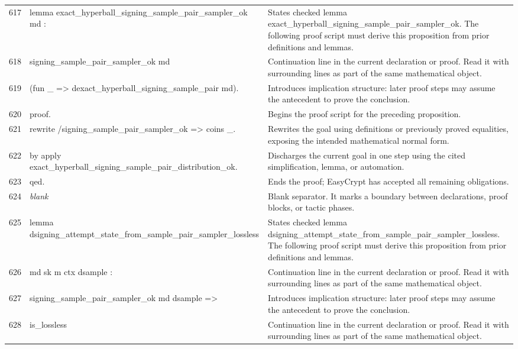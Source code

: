 \documentclass[10pt]{article}
\begin{document}
\begin{longtable}{r L{0.53\textwidth} L{0.37\textwidth}}
617 & {\ttfamily\scriptsize lemma exact\_hyperball\_signing\_sample\_pair\_sampler\_ok md :} & States checked lemma exact\_hyperball\_signing\_sample\_pair\_sampler\_ok.  The following proof script must derive this proposition from prior definitions and lemmas. \\
618 & {\ttfamily\scriptsize   signing\_sample\_pair\_sampler\_ok md} & Continuation line in the current declaration or proof.  Read it with surrounding lines as part of the same mathematical object. \\
619 & {\ttfamily\scriptsize     (fun \_ => dexact\_hyperball\_signing\_sample\_pair md).} & Introduces implication structure: later proof steps may assume the antecedent to prove the conclusion. \\
620 & {\ttfamily\scriptsize proof.} & Begins the proof script for the preceding proposition. \\
621 & {\ttfamily\scriptsize rewrite /signing\_sample\_pair\_sampler\_ok => coins \_.} & Rewrites the goal using definitions or previously proved equalities, exposing the intended mathematical normal form. \\
622 & {\ttfamily\scriptsize by apply exact\_hyperball\_signing\_sample\_pair\_distribution\_ok.} & Discharges the current goal in one step using the cited simplification, lemma, or automation. \\
623 & {\ttfamily\scriptsize qed.} & Ends the proof; EasyCrypt has accepted all remaining obligations. \\
624 & {\ttfamily\scriptsize \emph{blank}} & Blank separator.  It marks a boundary between declarations, proof blocks, or tactic phases. \\
625 & {\ttfamily\scriptsize lemma dsigning\_attempt\_state\_from\_sample\_pair\_sampler\_lossless} & States checked lemma dsigning\_attempt\_state\_from\_sample\_pair\_sampler\_lossless.  The following proof script must derive this proposition from prior definitions and lemmas. \\
626 & {\ttfamily\scriptsize    md sk m ctx dsample :} & Continuation line in the current declaration or proof.  Read it with surrounding lines as part of the same mathematical object. \\
627 & {\ttfamily\scriptsize   signing\_sample\_pair\_sampler\_ok md dsample =>} & Introduces implication structure: later proof steps may assume the antecedent to prove the conclusion. \\
628 & {\ttfamily\scriptsize   is\_lossless} & Continuation line in the current declaration or proof.  Read it with surrounding lines as part of the same mathematical object. \\

\end{longtable}
\end{document}
